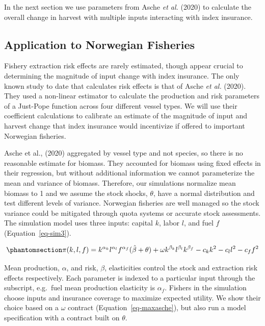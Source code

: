 \documentclass[
  letterpaper,
  DIV=11,
  numbers=noendperiod]{scrartcl}
\theoremstyle{plain}
\theoremstyle{plain}
\theoremstyle{remark}
\begin{document}
In the next section we use parameters from Asche \emph{et al.} (2020) to
calculate the overall change in harvest with multiple inputs interacting
with index insurance.

\subsection{Application to Norwegian
Fisheries}\label{application-to-norwegian-fisheries}

Fishery extraction risk effects are rarely estimated, though appear
crucial to determining the magnitude of input change with index
insurance. The only known study to date that calculates risk effects is
that of Asche \emph{et al.} (2020). They used a non-linear estimator to
calculate the production and risk parameters of a Just-Pope function
across four different vessel types. We will use their coefficient
calculations to calibrate an estimate of the magnitude of input and
harvest change that index insurance would incentivize if offered to
important Norwegian fisheries.

Asche et al., (2020) aggregated by vessel type and not species, so there
is no reasonable estimate for biomass. They accounted for biomass using
fixed effects in their regression, but without additional information we
cannot parameterize the mean and variance of biomass. Therefore, our
simulations normalize mean biomass to 1 and we assume the stock shocks,
\(\theta\), have a normal distribution and test different levels of
variance. Norwegian fisheries are well managed so the stock variance
could be mitigated through quota systems or accurate stock assessments.
The simulation model uses three inputs: capital \(k\), labor \(l\), and
fuel \(f\) (Equation~\ref{eq-sim3}).

\begin{equation}\phantomsection\label{eq-sim3}{
\pi(k,l,f)=k^{\alpha_k}l^{\alpha_l}f^{\alpha_f}(\hat\beta+\theta)+\omega k^{\beta_k}l^{\beta_l}k^{\beta_f}-c_kk^2-c_ll^2-c_ff^2
}\end{equation}

Mean production, \(\alpha\), and risk, \(\beta\), elasticities control
the stock and extraction risk effects respectively. Each parameter is
indexed to a particular input through the subscript, e.g.~fuel mean
production elasticity is \(\alpha_f\). Fishers in the simulation choose
inputs and insurance coverage to maximize expected utility. We show
their choice based on a \(\omega\) contract
(Equation~\ref{eq-maxasche}), but also run a model specification with a
contract built on \(\theta\).
\end{document}
